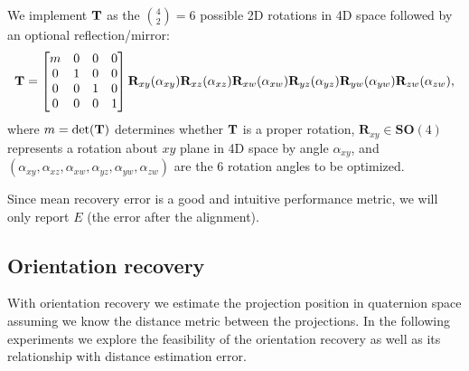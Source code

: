 We implement $\mathbf{T}$ as the $\binom{4}{2}=6$ possible 2D rotations in 4D space followed by an optional reflection/mirror:
\begin{equation*}
    \mathbf{T} =
    \begin{bmatrix}
        m & 0 & 0 & 0 \\
        0 & 1 & 0 & 0 \\
        0 & 0 & 1 & 0 \\
        0 & 0 & 0 & 1 \\
    \end{bmatrix}
    \mathbf{R}_{xy}(\alpha_{xy}) \mathbf{R}_{xz}(\alpha_{xz}) \mathbf{R}_{xw}(\alpha_{xw}) \mathbf{R}_{yz}(\alpha_{yz}) \mathbf{R}_{yw}(\alpha_{yw}) \mathbf{R}_{zw}(\alpha_{zw}),
\end{equation*}
where $m = \det(\mathbf{T})$ determines whether $\mathbf{T}$ is a proper rotation, $\mathbf{R}_{xy} \in \mathbf{SO}(4)$ represents a rotation about $xy$ plane in 4D space by angle $\alpha_{xy}$, and $(\alpha_{xy},\alpha_{xz},\alpha_{xw},\alpha_{yz},\alpha_{yw},\alpha_{zw})$ are the 6 rotation angles to be optimized.

Since mean recovery error is a good and intuitive performance metric, we will only report $E$ (the error after the alignment).


\subsection{Orientation recovery}\label{sec:results:orientation-recovery}

With orientation recovery we estimate the projection position in quaternion space assuming we know the distance metric between the projections. In the following experiments we explore the feasibility of the orientation recovery as well as its relationship with distance estimation error.

